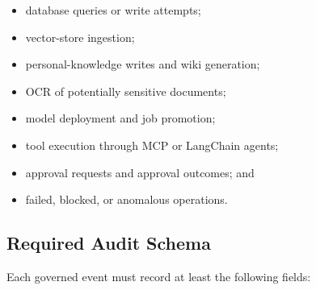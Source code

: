 \documentclass[11pt,a4paper]{article}
\begin{document}
\begin{itemize}[nosep]
    \item database queries or write attempts;
    \item vector-store ingestion;
    \item personal-knowledge writes and wiki generation;
    \item OCR of potentially sensitive documents;
    \item model deployment and job promotion;
    \item tool execution through MCP or LangChain agents;
    \item approval requests and approval outcomes; and
    \item failed, blocked, or anomalous operations.
\end{itemize}

\subsection{Required Audit Schema}
\label{sec:audit-schema}

Each governed event must record at least the following fields:
\end{document}
